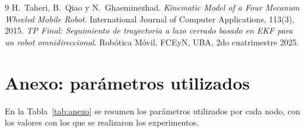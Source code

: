 \documentclass[11pt,a4paper]{article}
\begin{document}
\appendix
\begin{thebibliography}{9}
 H.~Taheri, B.~Qiao y N.~Ghaeminezhad. \emph{Kinematic Model of a Four Mecanum Wheeled Mobile Robot}. International Journal of Computer Applications, 113(3), 2015.
 \emph{TP Final: Seguimiento de trayectoria a lazo cerrado basado en EKF para un robot omnidireccional}. Robótica Móvil, FCEyN, UBA, 2do cuatrimestre 2025.
\end{thebibliography}

\section{Anexo: parámetros utilizados}

En la Tabla~\ref{tab:anexo} se resumen los parámetros utilizados por cada nodo, con los valores con los que se realizaron los experimentos.
\end{document}
